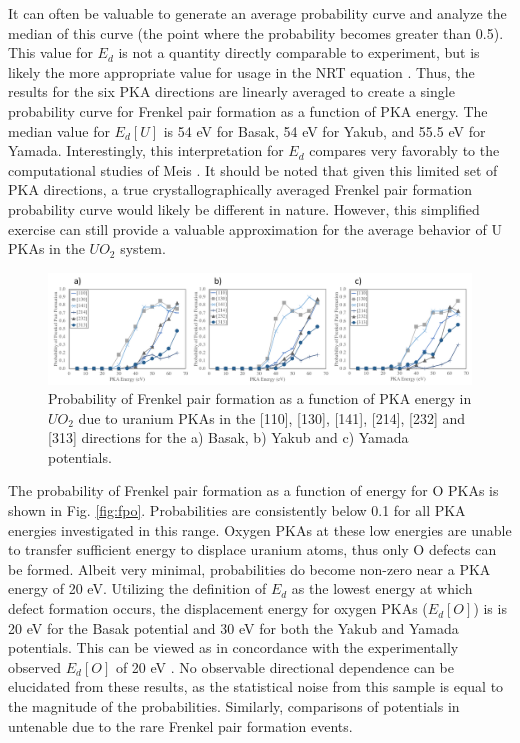 \documentclass[8pt]{article}   	%
\begin{document}
It can often be valuable to generate an average probability curve and analyze the median of this curve (the point where the probability becomes greater than 0.5). This value for $E_{d}$ is not a quantity directly comparable to experiment, but is likely the more appropriate value for usage in the NRT equation \cite{nordlund2006, beelertde}. Thus, the results for the six PKA directions are linearly averaged to create a single probability curve for Frenkel pair formation as a function of PKA energy. The median value for $E_d [U]$ is 54 eV for Basak, 54 eV for Yakub, and 55.5 eV for Yamada. Interestingly, this interpretation for $E_{d}$ compares very favorably to the computational studies of Meis \cite{meis2005}. It should be noted that given this limited set of PKA directions, a true crystallographically averaged Frenkel pair formation probability curve would likely be different in nature. However, this simplified exercise can still provide a valuable approximation for the average behavior of U PKAs in the $UO_{2}$ system.

\begin{figure}[h]
 \centering
 \includegraphics[width=1.0\textwidth]{FP_U.png}
 \caption{Probability of Frenkel pair formation as a function of PKA energy in $UO_2$ due to uranium PKAs in the [110], [130], [141], [214], [232] and [313] directions for the a) Basak, b) Yakub and c) Yamada potentials.  }
 \label{fig:fpu}
\end{figure}

The probability of Frenkel pair formation as a function of energy for O PKAs is shown in Fig. \ref{fig:fpo}. Probabilities are consistently below 0.1 for all PKA energies investigated in this range. Oxygen PKAs at these low energies are unable to transfer sufficient energy to displace uranium atoms, thus only O defects can be formed. Albeit very minimal, probabilities do become non-zero near a PKA energy of 20 eV. Utilizing the definition of $E_d$ as the lowest energy at which defect formation occurs, the displacement energy for oxygen PKAs ($E_d [O]$) is is 20 eV for the Basak potential and 30 eV for both the Yakub and Yamada potentials. This can be viewed as in concordance with the experimentally observed $E_d [O]$ of 20 eV \cite{soullard1977,soullard1985}. No observable directional dependence can be elucidated from these results, as the statistical noise from this sample is equal to the magnitude of the probabilities. Similarly, comparisons of potentials in untenable due to the rare Frenkel pair formation events.
\end{document}

